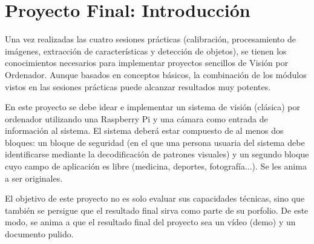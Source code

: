 \chapter{Proyecto Final: \textbf{Introducción}}
\label{chapter:introduction_lab_project}

Una vez realizadas las cuatro sesiones prácticas (calibración, procesamiento de imágenes, extracción de características y detección de objetos), se tienen los conocimientos necesarios para implementar proyectos sencillos de Visión por Ordenador. Aunque basados en conceptos básicos, la combinación de los módulos vistos en las sesiones prácticas puede alcanzar resultados muy potentes. 

En este proyecto se debe idear e implementar un sistema de visión (clásica) por ordenador utilizando una Raspberry Pi y una cámara como entrada de información al sistema. El sistema deberá estar compuesto de al menos dos bloques: un bloque de seguridad (en el que una persona usuaria del sistema debe identificarse mediante la decodificación de patrones visuales) y un segundo bloque cuyo campo de aplicación es libre (medicina, deportes, fotografía...). Se les anima a ser originales.

El objetivo de este proyecto no es solo evaluar sus capacidades técnicas, sino que también se persigue que el resultado final sirva como parte de su porfolio. De este modo, se anima a que el resultado final del proyecto sea un vídeo (demo) y un documento pulido.
